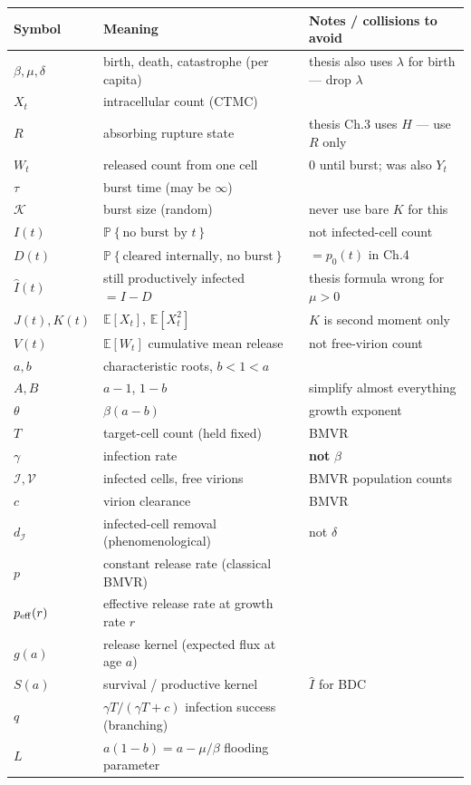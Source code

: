 \documentclass[11pt,a4paper]{article}
\newcommand{\E}{\mathbb{E}}
\newcommand{\Prob}[1]{\mathbb{P}\!\left\{#1\right\}}
\newcommand{\xt}{X_t}
\newcommand{\wt}{W_t}
\newcommand{\Ihat}{\widehat{I}}
\newcommand{\Kb}{\mathcal{K}}
\newcommand{\Icell}{\mathcal{I}}
\newcommand{\Vfree}{\mathcal{V}}
\newcommand{\Aa}{A}
\newcommand{\Bb}{B}
\theoremstyle{plain}
\theoremstyle{definition}
\theoremstyle{remark}
\begin{document}
{\small
\renewcommand{\arraystretch}{1.15}
\begin{tabular}{@{}llp{}@{}}
\toprule
Symbol & Meaning & Notes / collisions to avoid \\
\midrule
$\beta,\mu,\delta$ & birth, death, catastrophe (per capita) &
  thesis also uses $\lambda$ for birth --- drop $\lambda$ \\
$\xt$ & intracellular count (CTMC) & \\
$R$ & absorbing rupture state & thesis Ch.3 uses $H$ --- use $R$ only \\
$\wt$ & released count from one cell & $0$ until burst; was also $Y_t$ \\
$\tau$ & burst time (may be $\infty$) & \\
$\Kb$ & burst size (random) & never use bare $K$ for this \\
$I(t)$ & $\Prob{\text{no burst by }t}$ & not infected-cell count \\
$D(t)$ & $\Prob{\text{cleared internally, no burst}}$ & $=p_0(t)$ in Ch.4 \\
$\Ihat(t)$ & still productively infected $=I-D$ & thesis formula wrong for $\mu>0$ \\
$J(t),K(t)$ & $\E[\xt]$, $\E[\xt^2]$ & $K$ is second moment only \\
$V(t)$ & $\E[\wt]$ cumulative mean release & not free-virion count \\
$a,b$ & characteristic roots, $b<1<a$ & \\
$\Aa,\Bb$ & $a-1$, $1-b$ & simplify almost everything \\
$\theta$ & $\beta(a-b)$ & growth exponent \\
$T$ & target-cell count (held fixed) & BMVR \\
$\gamma$ & infection rate & \textbf{not} $\beta$ \\
$\Icell,\Vfree$ & infected cells, free virions & BMVR population counts \\
$c$ & virion clearance & BMVR \\
$d_{\Icell}$ & infected-cell removal (phenomenological) & not $\delta$ \\
$p$ & constant release rate (classical BMVR) & \\
$p_{\rm eff}(r)$ & effective release rate at growth rate $r$ & \\
$g(a)$ & release kernel (expected flux at age $a$) & \\
$S(a)$ & survival / productive kernel & $\Ihat$ for BDC \\
$q$ & $\gamma T/(\gamma T+c)$ infection success (branching) & \\
$L$ & $a(1-b)=a-\mu/\beta$ flooding parameter & \\
\bottomrule
\end{tabular}
}
\end{document}
